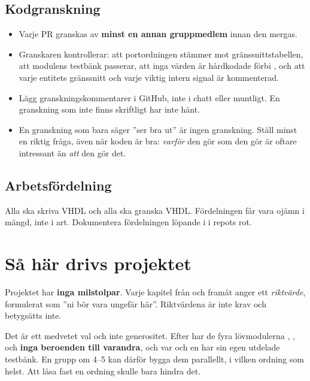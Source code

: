 \subsection{Kodgranskning}
\begin{itemize}
  \item Varje PR granskas av \textbf{minst en annan gruppmedlem} innan den mergas.
  \item Granskaren kontrollerar: att portordningen stämmer mot gränssnittstabellen, att modulens
    testbänk passerar, att inga värden är hårdkodade förbi , och att varje entitets
    gränssnitt och varje viktig intern signal är kommenterad.
  \item Lägg granskningskommentarer i GitHub, inte i chatt eller muntligt. En granskning som inte
    finns skriftligt har inte hänt.
  \item En granskning som bara säger ”ser bra ut” är ingen granskning. Ställ minst en riktig fråga,
    även när koden är bra: \emph{varför} den gör som den gör är oftare intressant än \emph{att} den
    gör det.
\end{itemize}

\subsection{Arbetsfördelning}
Alla ska skriva VHDL och alla ska granska VHDL. Fördelningen får vara ojämn i mängd, inte i art.
Dokumentera fördelningen löpande i  i repots rot.

\section{Så här drivs projektet}
\label{app:project:drive}

Projektet har \textbf{inga milstolpar}. Varje kapitel från  och framåt anger ett
\emph{riktvärde}, formulerat som ”ni bör vara ungefär här”. Riktvärdena är inte krav och betygsätts
inte.

Det är ett medvetet val och inte generositet. Efter  har de fyra lövmodulerna
, ,  och  \textbf{inga beroenden
till varandra}, och var och en har sin egen utdelade testbänk. En grupp om 4--5 kan därför bygga dem
parallellt, i vilken ordning som helst. Att låsa fast en ordning skulle bara hindra det.

